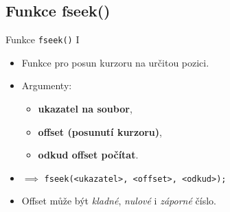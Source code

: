 \documentclass[14pt,aspectratio=169]{beamer}
\begin{document}
    \subsection{Funkce fseek()}
    \begin{frame}[t]{Funkce \texttt{fseek()} \textrm{I}}
        \begin{itemize}
            \item Funkce pro posun kurzoru na určitou pozici.
            \item Argumenty:
            \begin{itemize}
                \item \textbf{ukazatel na soubor},
                \item \textbf{offset (posunutí kurzoru)},
                \item \textbf{odkud offset počítat}.
            \end{itemize}
            \item $\implies$ \texttt{fseek(<ukazatel>, <offset>, <odkud>);}
            \item Offset může být \emph{kladné}, \emph{nulové} i \emph{záporné} číslo.
        \end{itemize}
    \end{frame}
\end{document}
